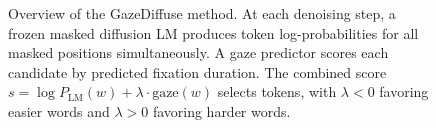 %
%
%
%

\begin{figure}[t]
\centering
\caption{
  Overview of the GazeDiffuse method. At each denoising step, a frozen
  masked diffusion LM produces token log-probabilities for all masked
  positions simultaneously. A gaze predictor scores each candidate by
  predicted fixation duration. The combined score
  $s = \log P_{\text{LM}}(w) + \lambda \cdot \text{gaze}(w)$ selects
  tokens, with $\lambda < 0$ favoring easier words and $\lambda > 0$
  favoring harder words.
}
\label{fig:method}
\end{figure}
